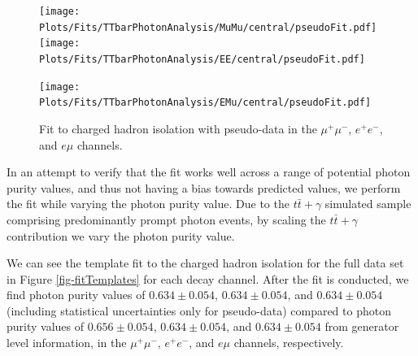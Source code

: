 \begin{figure}
\texttt{[image: Plots/Fits/TTbarPhotonAnalysis/MuMu/central/pseudoFit.pdf]}
\texttt{[image: Plots/Fits/TTbarPhotonAnalysis/EE/central/pseudoFit.pdf]}\\
\begin{center}
\texttt{[image: Plots/Fits/TTbarPhotonAnalysis/EMu/central/pseudoFit.pdf]}
\end{center}
\caption{Fit to charged hadron isolation with pseudo-data in the $\mu^{+}\mu^{-}$, $e^{+}e^{-}$, and $e\mu$ channels.}
\label{fig-pseudofit}
\end{figure}

In an attempt to verify that the fit works well across a range of potential photon purity values, and thus not having a bias towards predicted values, we perform the fit while varying the photon purity value. Due to the $t\bar{t}+\gamma$ simulated sample comprising predominantly prompt photon events, by scaling the $t\bar{t}+\gamma$ contribution we vary the photon purity value. 




We can see the template fit to the charged hadron isolation for the full data set in Figure \ref{fig-fitTemplates} for each decay channel. After the fit is conducted, we find photon purity values of $0.634 \pm 0.054$, $0.634 \pm 0.054$, and $0.634 \pm 0.054$ (including statistical uncertainties only for pseudo-data) compared to photon purity values of $0.656 \pm 0.054$, $0.634 \pm 0.054$, and $0.634 \pm 0.054$ from generator level information, in the $\mu^{+}\mu^{-}$, $e^{+}e^{-}$, and $e\mu$ channels, respectively. 


